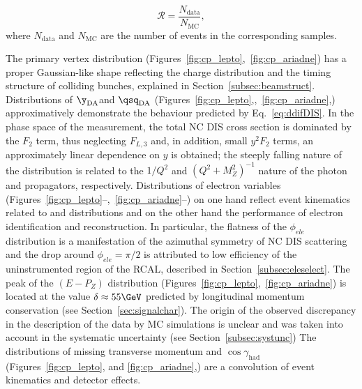 \begin{equation}
\mathcal{R} = \frac{N_\text{data}}{N_\text{MC}},
\label{eq:mcrescale}
\end{equation}
where $N_\text{data}$ and $N_\text{MC}$ are the number of events in the corresponding samples. 

The primary vertex distribution (Figures~\ref{fig:cp_lepto},~\ref{fig:cp_ariadne}) has a proper Gaussian-like shape reflecting the charge distribution and the timing structure of colliding bunches, explained in Section~\ref{subsec:beamstruct}. Distributions of $\y_\text{DA}$and $\qsq_\text{DA}$ (Figures~\ref{fig:cp_lepto},,~\ref{fig:cp_ariadne},) approximatively demonstrate the behaviour predicted by Eq.~\eqref{eq:ddifDIS}. In the phase space of the measurement, the total NC DIS cross section is dominated by the $F_2$ term, thus neglecting $F_{L,3}$ and, in addition, small $y^2F_2$ terms, an approximately linear dependence on $y$ is obtained; the steeply falling nature of the \qsq distribution is related to the $1/Q^2$ and $\left(Q^2 + M_Z^2\right)^{-1}$ nature of the photon and \zn propagators, respectively. Distributions of electron variables (Figures~\ref{fig:cp_lepto}--,~\ref{fig:cp_ariadne}--) on one hand reflect event kinematics related to \qsq and \y distributions and on the other hand the performance of electron identification and reconstruction. In particular, the flatness of the $\phi_{ele}$ distribution is a manifestation of the azimuthal symmetry of NC DIS scattering and the drop around $\phi_{ele}=\pi/2$ is attributed to low efficiency of the uninstrumented region of the RCAL, described in Section~\ref{subsec:eleselect}. The peak of the $\left(E-P_Z\right)$ distribution (Figures~\ref{fig:cp_lepto},~\ref{fig:cp_ariadne}) is located at the value $\delta \approx 55 \GeV$ predicted by longitudinal momentum conservation (see Section~\ref{sec:signalchar}). The origin of the observed discrepancy in the description of the data by MC simulations is unclear and was taken into account in the systematic uncertainty (see Section~\ref{subsec:systunc}) The distributions of missing transverse momentum and $\cos{\gamma_\text{had}}$ (Figures~\ref{fig:cp_lepto}, and \ref{fig:cp_ariadne},) are a convolution of event kinematics and detector effects.

